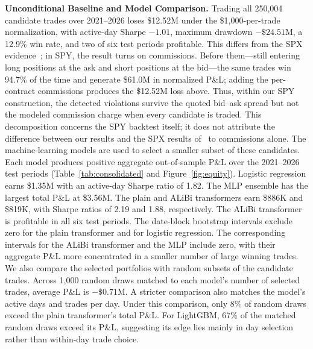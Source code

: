 \documentclass[sigconf]{acmart}
\begin{document}
\smallskip\noindent\textbf{Unconditional Baseline and Model Comparison.}
Trading all 250{,}004 candidate trades over 2021--2026 loses \$12.52M under the \$1{,}000-per-trade normalization, with active-day Sharpe $-1.01$, maximum drawdown $-\$24.51$M, a 12.9\% win rate, and two of six test periods profitable.
This differs from the SPX evidence~\cite{glasserman2025tp2}; in SPY, the result turns on commissions. Before them---still entering long positions at the ask and short positions at the bid---the same trades win 94.7\% of the time and generate \$61.0M in normalized P\&L; adding the per-contract commissions produces the \$12.52M loss above. Thus, within our SPY construction, the detected violations survive the quoted bid--ask spread but not the modeled commission charge when every candidate is traded. This decomposition concerns the SPY backtest itself; it does not attribute the difference between our results and the SPX results of~\cite{glasserman2025tp2} to commissions alone.
The machine-learning models are used to select a smaller subset of these candidates. Each model produces positive aggregate out-of-sample P\&L over the 2021--2026 test periods (Table~\ref{tab:consolidated} and Figure~\ref{fig:equity}). Logistic regression earns \$1.35M with an active-day Sharpe ratio of 1.82. The MLP ensemble has the largest total P\&L at \$3.56M. The plain and ALiBi transformers earn \$886K and \$819K, with Sharpe ratios of 2.19 and 1.88, respectively. The ALiBi transformer is profitable in all six test periods.
The date-block bootstrap intervals exclude zero for the plain transformer and for logistic regression. The corresponding intervals for the ALiBi transformer and the MLP include zero, with their aggregate P\&L more concentrated in a smaller number of large winning trades.
We also compare the selected portfolios with random subsets of the candidate trades. Across 1{,}000 random draws matched to each model's number of selected trades, average P\&L is $-\$0.71$M. A stricter comparison also matches the model's active days and trades per day. Under this comparison, only 8\% of random draws exceed the plain transformer's total P\&L. For LightGBM, 67\% of the matched random draws exceed its P\&L, suggesting its edge lies mainly in day selection rather than within-day trade choice.
\end{document}
